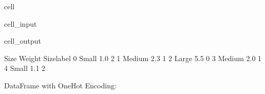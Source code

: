 \documentclass[letterpaper,10pt,english]{jupyterBook}
\begin{document}
\begin{sphinxuseclass}{cell}\begin{sphinxVerbatimInput}

\begin{sphinxuseclass}{cell_input}
\begin{sphinxVerbatim}[commandchars=\\\{\}]
\end{sphinxVerbatim}

\end{sphinxuseclass}\end{sphinxVerbatimInput}
\begin{sphinxVerbatimOutput}

\begin{sphinxuseclass}{cell_output}
\begin{sphinxVerbatim}[commandchars=\\\{\}]
     Size  Weight  Size\PYGZus{}label
0   Small     1.0           2
1  Medium     2.3           1
2   Large     5.5           0
3  Medium     2.0           1
4   Small     1.1           2
\end{sphinxVerbatim}

\end{sphinxuseclass}\end{sphinxVerbatimOutput}

\end{sphinxuseclass}
\sphinxAtStartPar
DataFrame with One\sphinxhyphen{}Hot Encoding:
\end{document}
